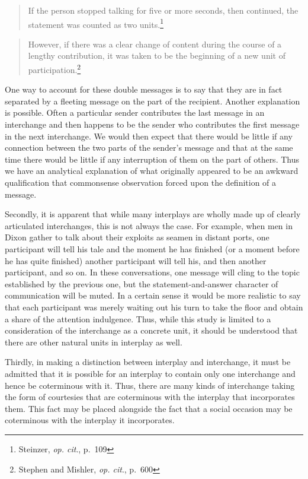 \documentclass[openany,nobib]{tufte-book}
\begin{document}
\begin{quote}
If the person stopped talking for five or more seconds, then continued,
the statement was counted as two units.\footnote{Steinzer, \emph{op.
  cit}., p.~109}
\end{quote}

\begin{quote}
However, if there was a clear change of content during the course of a
lengthy contribution, it was taken to be the beginning of a new unit of
participation.\footnote{Stephen and Mishler, \emph{op. cit}., p.~600}
\end{quote}

One way to account for these double messages is to say that they are in
fact separated by a fleeting message on the part of the recipient.
Another explanation is possible. Often a particular sender contributes
the last message in an interchange and then happens to be the sender who
contributes the first message in the next interchange. We would then
expect that there would be little if any connection between the two
parts of the sender's message and that at the same time there would be
little if any interruption of them on the part of others. Thus we have
an analytical explanation of what originally appeared to be an awkward
qualification that commonsense observation forced upon the definition of
a message.

Secondly, it is apparent that while many interplays are wholly made up
of clearly articulated interchanges, this is not always the case. For
example, when men in Dixon gather to talk about their exploits as seamen
in distant ports, one participant will tell his tale and the moment he
has finished (or a moment before he has quite finished) another
participant will tell his, and then another participant, and so on. In
these conversations, one message will cling to the topic established by
the previous one, but the statement-and-answer character of
communication will be muted. In a certain sense it would be more
realistic to say that each participant was merely waiting out his turn
to take the floor and obtain a share of the attention indulgence. Thus,
while this study is limited to a consideration of the interchange as a
concrete unit, it should be understood that there are other natural
units in interplay as well.

Thirdly, in making a distinction between interplay and interchange, it
must be admitted that it is possible for an interplay to contain only
one interchange and hence be coterminous with it. Thus, there are many
kinds of interchange taking the form of courtesies that are coterminous
with the interplay that incorporates them. This fact may be placed
alongside the fact that a social occasion may be coterminous with the
interplay it incorporates.
\end{document}

